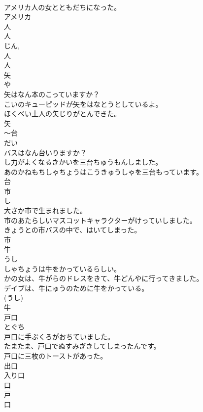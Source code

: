 \documentclass[8pt]{extreport}
\begin{document}
\begin{CJK}{UTF8}{min}
\\	アメリカ人の女とともだちになった。	
\\	アメリカ 
\\	人 
\\	人 
\\	じん, 
\\	人 
\\	人	
\\	矢	
\\	や	
\\	矢はなん本のこっていますか？	
\\	こいのキューピッドが矢をはなとうとしているよ。	
\\	ほくべい土人の矢じりがとんできた。	
\\	矢	
\\	〜台	
\\	だい	
\\	バスはなん台いりますか？	
\\	し力がよくなるきかいを三台ちゅうもんしました。	
\\	あのかねもちしゃちょうはこうきゅうしゃを三台もっています。	
\\	台	
\\	市	
\\	し	
\\	大さか市で生まれました。	
\\	市のあたらしいマスコットキャラクターがけっていしました。	
\\	きょうとの市バスの中で、はいてしまった。	
\\	市	
\\	牛	
\\	うし	
\\	しゃちょうは牛をかっているらしい。	
\\	かの女は、牛がらのドレスをきて、牛どんやに行ってきました。	
\\	デイブは、牛にゅうのために牛をかっている。	
\\	(うし) 
\\	牛	
\\	戸口	
\\	とぐち	
\\	戸口に手ぶくろがおちていました。	
\\	たまたま、戸口でぬすみぎきしてしまったんです。	
\\	戸口に三枚のトーストがあった。	
\\	出口 
\\	入り口 
\\	口 
\\	戸
\\	口 

\end{CJK}
\end{document}
